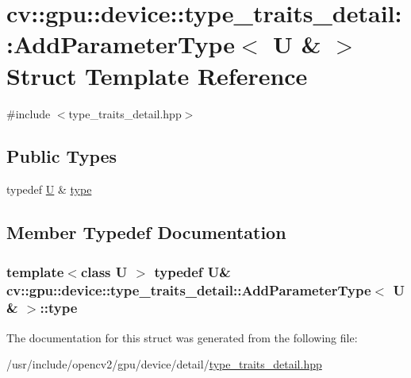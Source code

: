 \hypertarget{structcv_1_1gpu_1_1device_1_1type__traits__detail_1_1AddParameterType_3_01U_01_6_01_4}{\section{cv\-:\-:gpu\-:\-:device\-:\-:type\-\_\-traits\-\_\-detail\-:\-:Add\-Parameter\-Type$<$ U \& $>$ Struct Template Reference}
\label{structcv_1_1gpu_1_1device_1_1type__traits__detail_1_1AddParameterType_3_01U_01_6_01_4}
}


{\ttfamily \#include $<$type\-\_\-traits\-\_\-detail.\-hpp$>$}

\subsection*{Public Types}
\begin{DoxyCompactItemize}
\item 
typedef \hyperlink{core__c_8h_aa9c521f41af9a5191e5e4b6ffbae211a}{U} \& \hyperlink{structcv_1_1gpu_1_1device_1_1type__traits__detail_1_1AddParameterType_3_01U_01_6_01_4_aeb23765e9f73f863f8e2470d67137009}{type}
\end{DoxyCompactItemize}


\subsection{Member Typedef Documentation}
\hypertarget{structcv_1_1gpu_1_1device_1_1type__traits__detail_1_1AddParameterType_3_01U_01_6_01_4_aeb23765e9f73f863f8e2470d67137009}{
\subsubsection[{type}]{\setlength{\rightskip}{0pt plus 5cm}template$<$class U $>$ typedef {\bf U}\& {\bf cv\-::gpu\-::device\-::type\-\_\-traits\-\_\-detail\-::\-Add\-Parameter\-Type}$<$ {\bf U} \& $>$\-::{\bf type}}}\label{structcv_1_1gpu_1_1device_1_1type__traits__detail_1_1AddParameterType_3_01U_01_6_01_4_aeb23765e9f73f863f8e2470d67137009}


The documentation for this struct was generated from the following file\-:\begin{DoxyCompactItemize}
\item 
/usr/include/opencv2/gpu/device/detail/\hyperlink{type__traits__detail_8hpp}{type\-\_\-traits\-\_\-detail.\-hpp}\end{DoxyCompactItemize}
